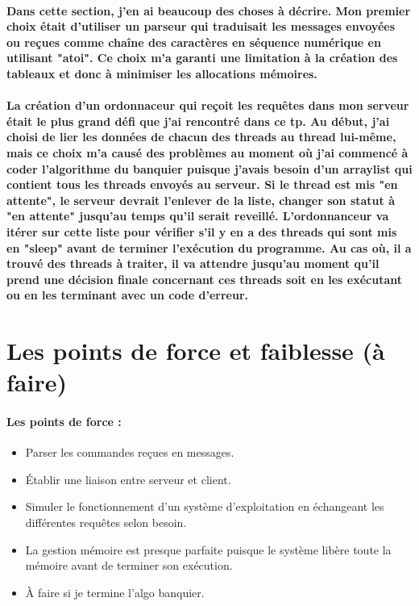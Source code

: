 \documentclass{article}
\begin{document}
\paragraph{Dans cette section, j'en ai beaucoup des choses à décrire. Mon premier choix était d'utiliser un parseur qui traduisait les messages envoyées ou reçues comme chaîne des caractères en séquence numérique en utilisant "atoi". Ce choix m'a garanti une limitation à la création des tableaux et donc à minimiser les allocations mémoires. }

\paragraph{La création d'un ordonnaceur qui reçoit les requêtes dans mon serveur était le plus grand défi que j'ai rencontré dans ce tp. Au début, j'ai choisi de lier les données de chacun des threads au thread lui-même, mais ce choix m'a causé des problèmes au moment où j'ai commencé à coder l'algorithme du banquier puisque j'avais besoin d'un arraylist qui contient tous les threads envoyés au serveur. Si le thread est mis "en attente", le serveur devrait l'enlever de la liste, changer son statut à "en attente" jusqu'au temps qu'il serait reveillé. L'ordonnanceur va itérer sur cette liste pour vérifier s'il y en a des threads qui sont mis en "sleep" avant de terminer l'exécution du programme. Au cas où, il a trouvé des threads à traiter, il va attendre jusqu'au moment qu'il prend une décision finale concernant ces threads soit en les exécutant ou en les terminant avec un code d'erreur.}

\section{Les points de force et faiblesse (à faire)}
\paragraph{\textbf{Les points de force :}}
\begin{itemize}
\item Parser les commandes reçues en messages.
\item Établir une liaison entre serveur et client.
\item Simuler le fonctionnement d'un système d'exploitation en échangeant les différentes requêtes selon besoin.
\item La gestion mémoire est presque parfaite puisque le système libère toute la mémoire avant de terminer son exécution.
\item À faire si je termine l'algo banquier.
\end{itemize} 
\end{document}
